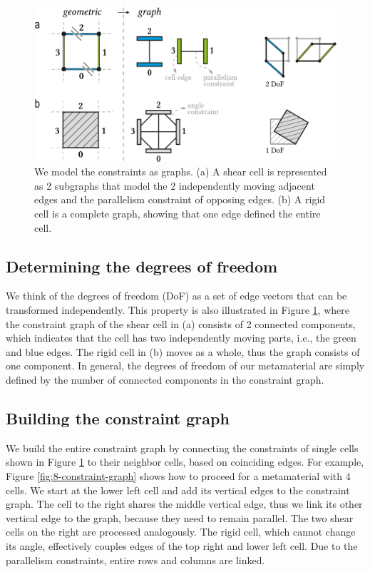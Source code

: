 \begin{figure} [h]
    \includegraphics[width=\textwidth]{chapters/understanding-metamaterial-mechanisms-FIG/7-single-cell-constraint-graph.png}
    \caption[Short figure name.]{We model the constraints as graphs. (a) A shear cell is represented as 2 subgraphs that model the 2 independently moving adjacent edges and the parallelism constraint of opposing edges. (b) A rigid cell is a complete graph, showing that one edge defined the entire cell.
    \label{fig:7-single-cell-constraint-graph}}
\end{figure}


\subsection{Determining the degrees of freedom}

We think of the degrees of freedom (DoF) as a set of edge vectors that can be transformed independently. This property is also illustrated in Figure \ref{fig:7-single-cell-constraint-graph}, where the constraint graph of the shear cell in (a) consists of 2 connected components, which indicates that the cell has two independently moving parts, i.e., the green and blue edges. The rigid cell in (b) moves as a whole, thus the graph consists of one component. In general, the degrees of freedom of our metamaterial are simply defined by the number of connected components in the constraint graph.


\subsection{Building the constraint graph}

We build the entire constraint graph by connecting the constraints of single cells shown in Figure \ref{fig:7-single-cell-constraint-graph} to their neighbor cells, based on coinciding edges. For example, Figure \ref{fig:8-constraint-graph} shows how to proceed for a metamaterial with 4 cells. We start at the lower left cell and add its vertical edges to the constraint graph. The cell to the right shares the middle vertical edge, thus we link its other vertical edge to the graph, because they need to remain parallel. The two shear cells on the right are processed analogously.  The rigid cell, which cannot change its angle, effectively couples edges of the top right and lower left cell. Due to the parallelism constraints, entire rows and columns are linked. 


